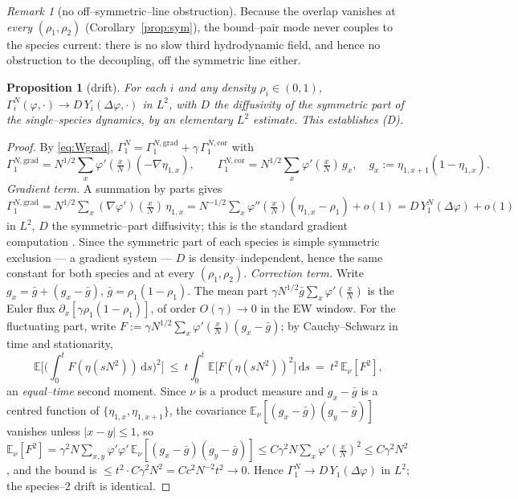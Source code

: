 \documentclass[11pt]{article}
\theoremstyle{plain}
\newtheorem{proposition}[theorem]{Proposition}
\theoremstyle{definition}
\theoremstyle{remark}
\newtheorem{remark}[theorem]{Remark}
\newcommand{\E}{\mathbb{E}}\newcommand{\PP}{\mathbb{P}}\newcommand{\dd}{\,\mathrm{d}}
\begin{document}
\begin{remark}[no off--symmetric--line obstruction]\label{rem:offline}
Because the overlap vanishes at \emph{every} $(\rho_1,\rho_2)$ (Corollary~\ref{prop:sym}),
the bound--pair mode never couples to the species current: there is no slow third
hydrodynamic field, and hence no obstruction to the decoupling, off the symmetric line
either.
\end{remark}

\begin{proposition}[drift]\label{prop:drift}
For each $i$ and any density $\rho_i\in(0,1)$,
$\Gamma_i^N(\varphi,\cdot)\to D\,Y_i(\Delta\varphi,\cdot)$ in $L^2$, with $D$ the
diffusivity of the symmetric part of the single--species dynamics, by an elementary
$L^2$ estimate. This establishes \textup{(D)}.
\end{proposition}
\begin{proof}
By \eqref{eq:Wgrad}, $\Gamma_1^N=\Gamma_1^{N,\mathrm{grad}}+\gamma\,\Gamma_1^{N,\mathrm{cor}}$
with
\[
  \Gamma_1^{N,\mathrm{grad}}=N^{1/2}\sum_x\varphi'(\tfrac xN)(-\nabla\eta_{1,x}),\qquad
  \Gamma_1^{N,\mathrm{cor}}=N^{1/2}\sum_x\varphi'(\tfrac xN)\,g_x,\quad g_x:=\eta_{1,x+1}(1-\eta_{1,x}).
\]
\emph{Gradient term.} A summation by parts gives
$\Gamma_1^{N,\mathrm{grad}}=N^{1/2}\sum_x(\nabla\varphi')(\tfrac xN)\,\eta_{1,x}
 =N^{-1/2}\sum_x\varphi''(\tfrac xN)(\eta_{1,x}-\rho_1)+o(1)=D\,Y_1^N(\Delta\varphi)+o(1)$
in $L^2$, $D$ the symmetric--part diffusivity; this is the standard gradient
computation \cite[Ch.~11]{KL}. Since the symmetric part of each species is simple
symmetric exclusion --- a gradient system --- $D$ is density--independent, hence the same
constant for both species and at every $(\rho_1,\rho_2)$.
\emph{Correction term.} Write $g_x=\bar g+(g_x-\bar g)$, $\bar g=\rho_1(1-\rho_1)$. The mean
part $\gamma N^{1/2}\bar g\sum_x\varphi'(\tfrac xN)$ is the Euler flux
$\partial_x[\gamma\rho_1(1-\rho_1)]$, of order $O(\gamma)\to0$ in the EW window. For the
fluctuating part, write $F:=\gamma N^{1/2}\sum_x\varphi'(\tfrac xN)(g_x-\bar g)$; by
Cauchy--Schwarz in time and stationarity,
\[
  \E\Big[\Big(\int_0^t F(\eta(sN^2))\dd s\Big)^2\Big]
  \ \le\ t\int_0^t\E\big[F(\eta(sN^2))^2\big]\dd s\ =\ t^2\,\E_\nu[F^2],
\]
an \emph{equal--time} second moment. Since $\nu$ is a product measure and $g_x-\bar g$
is a centred function of $\{\eta_{1,x},\eta_{1,x+1}\}$, the covariance
$\E_\nu[(g_x-\bar g)(g_y-\bar g)]$ vanishes unless $|x-y|\le1$, so
$\E_\nu[F^2]=\gamma^2N\sum_{x,y}\varphi'\varphi'\,\E_\nu[(g_x-\bar g)(g_y-\bar g)]
\le C\gamma^2N\sum_x\varphi'(\tfrac xN)^2\le C\gamma^2N^2$, and the bound is
$\le t^2\cdot C\gamma^2N^2=Cc^2N^{-2}t^2\to0$. Hence $\Gamma_1^N\to D\,Y_1(\Delta\varphi)$
in $L^2$; the species--$2$ drift is identical.
\end{proof}
\end{document}
